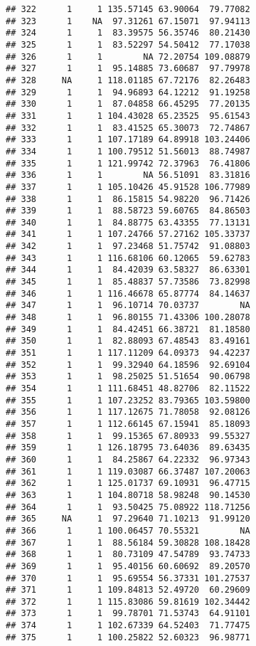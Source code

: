 \documentclass[
]{article}
\begin{document}
\begin{verbatim}
## 322      1     1 135.57145 63.90064  79.77082
## 323      1    NA  97.31261 67.15071  97.94113
## 324      1     1  83.39575 56.35746  80.21430
## 325      1     1  83.52297 54.50412  77.17038
## 326      1     1        NA 72.20754 109.08879
## 327      1     1  95.14885 73.60687  97.79978
## 328     NA     1 118.01185 67.72176  82.26483
## 329      1     1  94.96893 64.12212  91.19258
## 330      1     1  87.04858 66.45295  77.20135
## 331      1     1 104.43028 65.23525  95.61543
## 332      1     1  83.41525 65.30073  72.74867
## 333      1     1 107.17189 64.89918 103.24406
## 334      1     1 100.79512 51.56013  88.74987
## 335      1     1 121.99742 72.37963  76.41806
## 336      1     1        NA 56.51091  83.31816
## 337      1     1 105.10426 45.91528 106.77989
## 338      1     1  86.15815 54.98220  96.71426
## 339      1     1  88.58723 59.60765  84.86503
## 340      1     1  84.88775 63.43355  77.13131
## 341      1     1 107.24766 57.27162 105.33737
## 342      1     1  97.23468 51.75742  91.08803
## 343      1     1 116.68106 60.12065  59.62783
## 344      1     1  84.42039 63.58327  86.63301
## 345      1     1  85.48837 57.73586  73.82998
## 346      1     1 116.46678 65.87774  84.14637
## 347      1     1  96.10714 70.03737        NA
## 348      1     1  96.80155 71.43306 100.28078
## 349      1     1  84.42451 66.38721  81.18580
## 350      1     1  82.88093 67.48543  83.49161
## 351      1     1 117.11209 64.09373  94.42237
## 352      1     1  99.32940 64.18596  92.69104
## 353      1     1  98.25025 51.51654  90.06798
## 354      1     1 111.68451 48.82706  82.11522
## 355      1     1 107.23252 83.79365 103.59800
## 356      1     1 117.12675 71.78058  92.08126
## 357      1     1 112.66145 67.15941  85.18093
## 358      1     1  99.15365 67.80933  99.55327
## 359      1     1 126.18795 73.64036  89.63435
## 360      1     1  84.25867 64.22332  96.97343
## 361      1     1 119.03087 66.37487 107.20063
## 362      1     1 125.01737 69.10931  96.47715
## 363      1     1 104.80718 58.98248  90.14530
## 364      1     1  93.50425 75.08922 118.71256
## 365     NA     1  97.29640 71.10213  91.99120
## 366      1     1 100.06457 70.55321        NA
## 367      1     1  88.56184 59.30828 108.18428
## 368      1     1  80.73109 47.54789  93.74733
## 369      1     1  95.40156 60.60692  89.20570
## 370      1     1  95.69554 56.37331 101.27537
## 371      1     1 109.84813 52.49720  60.29609
## 372      1     1 115.83086 59.81619 102.34442
## 373      1     1  99.78701 71.53743  64.91101
## 374      1     1 102.67339 64.52403  71.77475
## 375      1     1 100.25822 52.60323  96.98771

\end{verbatim}
\end{document}

